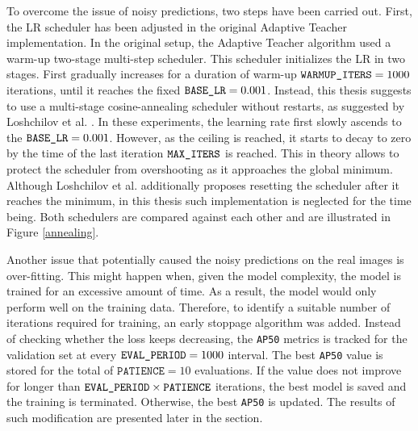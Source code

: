 To overcome the issue of noisy predictions, two steps have been carried out. First, the LR scheduler has been adjusted in the original Adaptive Teacher \cite{Li2021} implementation. In the original setup, the Adaptive Teacher algorithm used a warm-up two-stage multi-step scheduler. This scheduler initializes the LR in two stages.  First gradually increases for a duration of warm-up $\texttt{WARMUP\textunderscore ITERS} = 1000$ iterations, until it reaches the fixed $\texttt{BASE\textunderscore LR} = 0.001$.  Instead, this thesis suggests to use a multi-stage cosine-annealing scheduler without restarts, as suggested by Loshchilov et al. \cite{Loshchilov2016}. In these experiments, the learning rate first slowly ascends to the $\texttt{BASE\textunderscore LR} = 0.001$. However, as the ceiling is reached, it starts to decay to zero by the time of the last iteration $\texttt{MAX\textunderscore ITERS}$ is reached. This in theory allows to protect the scheduler from overshooting as it approaches the global minimum. Although Loshchilov et al. additionally proposes resetting the scheduler after it reaches the minimum, in this thesis such implementation is neglected for the time being. Both schedulers are compared against each other and are illustrated in Figure \ref{annealing}.

Another issue that potentially caused the noisy predictions on the real images is over-fitting. This might happen when, given the model complexity, the model is trained for an excessive amount of time. As a result, the model would only perform well on the training data. 
Therefore, to identify a suitable number of iterations required for training, an early stoppage algorithm was added. Instead of checking whether the loss keeps decreasing, the \texttt{AP50} metrics is tracked for the validation set at every $\texttt{EVAL\textunderscore PERIOD} = 1000$ interval. The best \texttt{AP50} value is stored for the total of $\texttt{PATIENCE} = 10$ evaluations. If the value does not improve for longer than $\texttt{EVAL\textunderscore PERIOD} \times \texttt{PATIENCE}$ iterations, the best model is saved and the training is terminated. Otherwise, the best \texttt{AP50} is updated. The results of such modification are presented later in the  section.  

